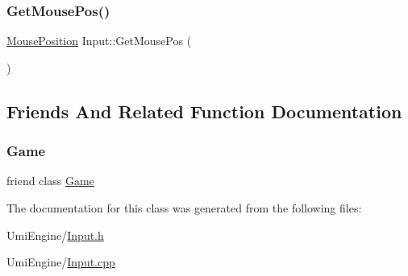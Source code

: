 \mbox{\label{class_input_a946fb755b072d22267097e7118c752c0}} 
\subsubsection{\texorpdfstring{GetMousePos()}{GetMousePos()}}
{\footnotesize\ttfamily \mbox{\hyperlink{struct_mouse_position}{Mouse\+Position}} Input\+::\+Get\+Mouse\+Pos (\begin{DoxyParamCaption}{ }\end{DoxyParamCaption})\hspace{0.3cm}{\ttfamily [static]}}



\subsection{Friends And Related Function Documentation}
\mbox{\label{class_input_aa2fab026580d6f14280c2ffb8063a314}} 
\subsubsection{\texorpdfstring{Game}{Game}}
{\footnotesize\ttfamily friend class \mbox{\hyperlink{class_game}{Game}}\hspace{0.3cm}{\ttfamily [friend]}}



The documentation for this class was generated from the following files\+:\begin{DoxyCompactItemize}
\item 
Umi\+Engine/\mbox{\hyperlink{_input_8h}{Input.\+h}}\item 
Umi\+Engine/\mbox{\hyperlink{_input_8cpp}{Input.\+cpp}}\end{DoxyCompactItemize}
